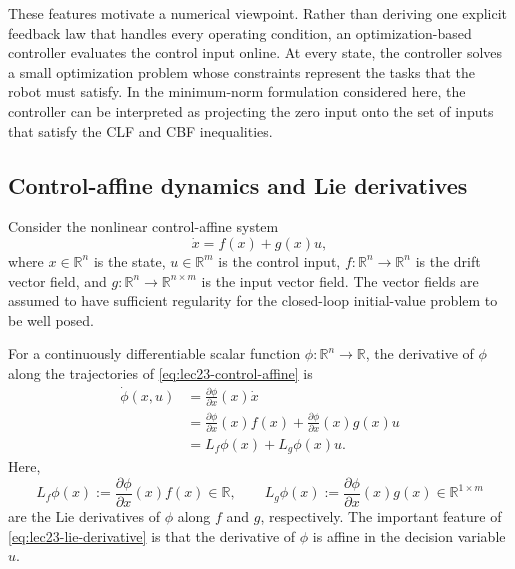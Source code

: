\documentclass[../../master-handout.tex]{subfiles}
\begin{document}
These features motivate a numerical viewpoint. Rather than deriving one explicit feedback law that handles every operating condition, an optimization-based controller evaluates the control input online. At every state, the controller solves a small optimization problem whose constraints represent the tasks that the robot must satisfy. In the minimum-norm formulation considered here, the controller can be interpreted as projecting the zero input onto the set of inputs that satisfy the CLF and CBF inequalities.

\subsection{Control-affine dynamics and Lie derivatives}

Consider the nonlinear control-affine system
\begin{equation}
    \dot{x}=f(x)+g(x)u,
    \label{eq:lec23-control-affine}
\end{equation}
where $x\in\mathbb{R}^{n}$ is the state, $u\in\mathbb{R}^{m}$ is the control input, $f:\mathbb{R}^{n}\rightarrow\mathbb{R}^{n}$ is the drift vector field, and $g:\mathbb{R}^{n}\rightarrow\mathbb{R}^{n\times m}$ is the input vector field. The vector fields are assumed to have sufficient regularity for the closed-loop initial-value problem to be well posed.

For a continuously differentiable scalar function $\phi:\mathbb{R}^{n}\rightarrow\mathbb{R}$, the derivative of $\phi$ along the trajectories of \eqref{eq:lec23-control-affine} is
\begin{align}
    \dot{\phi}(x,u)
    &=
    \frac{\partial\phi}{\partial x}(x)\dot{x}
    \nonumber\\
    &=
    \frac{\partial\phi}{\partial x}(x)f(x)
    +
    \frac{\partial\phi}{\partial x}(x)g(x)u
    \nonumber\\
    &=
    L_f\phi(x)+L_g\phi(x)u.
    \label{eq:lec23-lie-derivative}
\end{align}
Here,
\begin{equation}
    L_f\phi(x)
    :=
    \frac{\partial\phi}{\partial x}(x)f(x)
    \in\mathbb{R},
    \qquad
    L_g\phi(x)
    :=
    \frac{\partial\phi}{\partial x}(x)g(x)
    \in\mathbb{R}^{1\times m}
\end{equation}
are the Lie derivatives of $\phi$ along $f$ and $g$, respectively. The important feature of \eqref{eq:lec23-lie-derivative} is that the derivative of $\phi$ is affine in the decision variable $u$.
\end{document}
